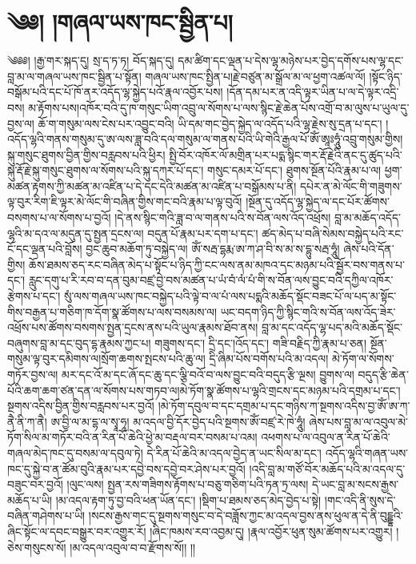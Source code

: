 \chapter{༄༅། །གཞལ་ཡས་ཁང་སྦྱིན་པ།}༄༅༅། །རྒྱ་གར་སྐད་དུ། སྲ་ད་ཏ་ཏ། བོད་སྐད་དུ། དམ་ཚིག་དང་ལྡན་པ་དེས་ལྷ་མཉེས་པར་བྱེད་དགོས་པས་ལྷ་དང་བླ་མ་ལ་གཞལ་ཡས་ཁང་སྦྱིན་པ་སྟོན། གཞལ་ཡས་ཁང་སྤྱིན་པ།རྗེ་བཙུན་མ་སྒྲོལ་མ་ལ་ཕྱག་འཚལ་ལོ། །སྟོང་ཉིད་བསྒོམ་པའི་དང་པོ་ཁོ་ནར་འདོད་ལྷ་སྐྱེད་པའོ་རྣལ་འབྱོར་པས། །དོན་དམ་པར་ན་འདི་ལྟར་ཡིན་པ་ལ་དེ་ལྟར་འདྲི་བས། མ་རྟོགས་པས།འཁོར་བའི་དུ་ཁ་གསུང་ཡིག་འབྲུ་ལ་སོགས་པ་ལས་སྙིང་རྗེ་ཆེན་པོས་འགྲོ་བ་མ་ལུས་པ་ཡུལ་དུ་བྱས་ལ། ཆོ་ག་གསུམ་ལས་ངེས་པར་འབྱུང་བའི། ཡི་དམ་གང་བྱེད་སྐྱེད་ལ་འདོད་པའི་ལྷ་རྗེས་སུ་དྲན་པ་དང་། །འདོད་ལྷའི་གནས་གསུམ་དུ་ཨ་ལས་ཟླ་བའི་དལ་གསུམ་ལ་གནས་པའི་ཡི་གེའི་རྒྱལ་པོ་ཨོཾ་ཨཱཿཧཱུཾ་འབྲུ་གསུམ་གྱིས། སྐུ་གསུང་ཐུགས་བྱིན་གྱིས་བརླབས་པའི་ཕྱིར། སྤྱི་བོར་འཁོར་ལོ་མགྲིན་པར་པདྨ་སྙིང་གར་རྡོ་རྗེའི་ནང་དུ་ཚུད་པའི་སྐུ་རྡོ་རྗེ་སྐུ་གསུང་ཐུགས་ལ་སོགས་པའི་སྐུ་དཀར་པོ་དང་། གསུང་དམར་པོ་དང་། ཐུགས་སྔོན་པོའི་རྣམ་པ་ལ། ཕྱག་མཚན་རྟགས་ཀྱི་མཚན་མ་འཛིན་པ་དེ་དང་དེའི་མཚན་མ་འཛིན་པ་བསྒོམས་པ་ནི། དཔེར་ན་མེ་ལོང་གི་གཟུགས་ལྟ་བུར་རིག་ཇི་ལྟར་མེ་ལོང་གི་བཞིན་གྱིས་གང་བའི་རྣམ་པ་ལྟ་བུའོ། །སྔོན་དུ་འདོད་ལྷ་སྐྱེད་ལ་དང་པོར་ཚོགས་བསགས་པ་ལ་སོགས་པ་བྱའོ། །དེ་ནས་སྙིང་གའི་ཟླ་བ་ལ་གནས་པའི་ས་བོན་ལས་འོད་འཕྲོས། བླ་མ་མཆོད་འདོད་ལྷའི་མ་དའ་ལ་མདུན་དུ་སྤྱན་དྲངས་ལ། བདུན་པོ་རྣམ་པར་དག་པ་དང་། ཚད་མེད་པ་བཞི་སེམས་བསྐྱེད་པའི་རང་ངོ་དང་ལྡན་པའི་བློས། བྱང་ཆུབ་མཆོག་ཏུ་བསྐྱེད་ལ། ཨོཾ་སརྦ་དྷརྨ་ཨ་ཀ་ཤ་བི་ས་མ་ས་དྷུ་སརྦ་ཧཱུཾ། ཞེས་པའི་དོན་གྱིས། ཆོས་ཐམས་ཅད་རང་བཞིན་མེད་པ་སྟོང་པ་ཉིད་ཀྱི་ངང་ལས་ནམ་མཁའ་དང་མཉམ་པའི་སྦྱོར་བས་གནས་པ་དང་། རླུང་དགུ་པ་རི་རབ་བ་དན་བུམ་བཛྲ་བྱེ་བས་མཚན་པ་ཡཾ་བཾ་ལཾ་པཾ་གི་ས་བོན་ལས་བྱུང་བའི་དཀྱིལ་འཁོར་རྩེགས་པ་དང་། སུཾ་ལས་གཞལ་ཡས་ཁང་བསྐྱེད་པའི་ལྟེ་བ་ལ་པཾ་ལས་པདྨའི་མཆོད་སྡོང་བཟང་པོ་ལ་པད་མ་སྟོང་གིས་བརྒྱན་པ་གཅིག་ཁ་དོག་སྣ་ཚོགས་པ་ལས་བསམས་ལ། ཡང་བདག་ཉིད་ཀྱི་སྙིང་གའི་ས་བོན་ལས་འོད་ཟེར་འཕྲོས་པས་ཚོགས་བསགས་སྤྱན་དྲངས་ནས་པའི་ཡུལ་རྣམས་ཐོབ་ནས། བླ་མ་དང་འདོད་ལྷ་པད་མའི་མཆོད་སྡོང་བཞུགས་བླ་མ་དང་བུད་དྷ་རྣམས་ཀྱང་པ། གཟུགས་དང་། དྲི་དང་།འོད་དང་། གཟི་བརྗིད་ཀྱི་རྣམ་པ་ཅན། སྔོན་གསུམ་ལྟ་བུར་དམིགས་ལ།སྲོག་ཆགས་སྤངས་པའི་ཆུ་ལ། དྲི་ཞིམ་པོས་བགོས་པའི་མ་འདལ། མེ་ཏོག་ལ་སོགས་གཏོར་བྱས་ལ། མར་དང་འོ་མ་དང་ཞོ་དང་ཆུ་དང་ལྕི་བའོ་བ་ལས་བྱུང་བའི་བདུད་རྩི་ལྔས། བྱུགས་ལ། བདུད་རྩི་ཆེན་པོའི་ཆག་ཆག་ཙན་དན་ལ་སོགས་པས་གཏབ་ལ།མེ་ཏོག་སྣ་ཚོགས་པ་ལྷའི་གྲངས་དང་མཉམ་པའི་དགྲམ་པ་དང་། སྔགས་འདིས་བྱིན་གྱིས་བརླབས་པར་བྱའོ། །མེ་ཏོག་དབུལ་བ་དང་དགྲམ་པ་དང་གཉིས་ཀ་སྔགས་འདིས་བྱ་ཨོཾ་ཨ་ཀ་ནཻ་ནི་ཀ་ནཻ། ཨ་བྱི་ལ་མ་དྷ་ལ་སྭཱ་ཧཱ། མ་འདལ་བྱི་དོར་བྱེད་པའི་སྔགས་ཨོཾ་བཛྲ་རེ་ཁེ་ཧཱུཾ། ཞེས་པས་བླ་མ་ལ་འབུལ་མེ་ཏོག་སིལ་མ་གཏོར་བའི་ན་རིན་པོ་ཆེའི་ཕྱེ་མ་བརྡལ་བར་བསམ་པ་འམ། འཕགས་པ་ལ་འབུལ་ན་རིན་པོ་ཆེའི་གཞལ་མེད་ཁང་དུ་བསམ་ལ་དབུལ་ཏེ། དེ་རིན་པོ་ཆེའི་མ་འདལ་བྱེད་ན་ཡང་སིལ་མ་དང་། འདོད་ལྷའི་གཞན་ཡས་ཁང་དུ་སྐྱེ་བ་ན་ཚོམ་བུའི་རྣམ་པར་དབྱེ་བས་དབྱེ་བར་ཤེས་པར་བྱའོ། །འདི་བླ་མ་གཙོ་བོར་མཆོད་པའི་མ་འདལ་དུ་བཟུང་བར་བྱའོ། །ལུང་ལས། སྤྱན་རས་གཟིགས་རྟོགས་པ་བཅུ་གཅིག་པའི་ཏན་ཏྲ་ལས། དེ་ཡང་བླ་མ་སངས་རྒྱས་མཆོད་པ་ཡི། །མ་འདལ་རྟག་ཏུ་བྱ་བའི་ཕན་ཡོན་དང་། །སྡིག་པ་ཐམས་ཅད་མེད་བྱེད་པ་སྟེ། །གང་འདི་ནི་སུས་དེ་བཞིན་གཤེགས་པ་ཡི། །སངས་རྒྱས་གང་དུ་སྔགས་གསུང་བ་དེ་བཟློས་ཀྱང་མ་འདལ་བྱས་ནས་ཕུལ་ན་དེ་ནི་བུངྡྷའི་ཞིང་སྟོང་ལ་དབང་བསྒྱུར་བར་འགྱུར་རོ། །ཞིང་ཁམས་རབ་འབྱམ་དུ། །རྣལ་འབྱོར་ཕུན་སུམ་ཚོགས་པར་འགྱུར། །ཅེས་གསུངས་སོ། །མ་འདལ་འབུལ་བ་བ་རྫོགས་སོ།། །།